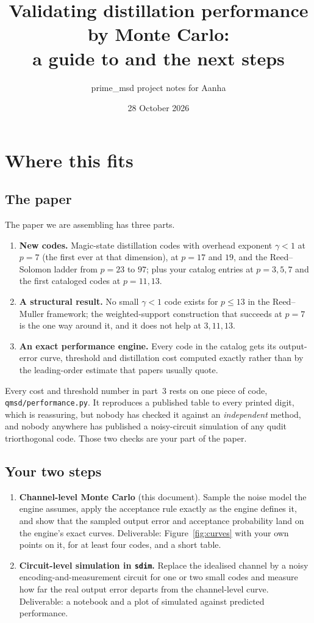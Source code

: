 \documentclass[11pt]{article}
\title{Validating distillation performance by Monte Carlo:\\ a guide to \code{qmsd.mc\_distill} and the next steps}
\author{prime\_msd project notes for Aanha}
\date{28 October 2026}
\newcommand{\code}[1]{\texttt{#1}}
\begin{document}
\maketitle
\tableofcontents

\section{Where this fits}

\subsection{The paper}

The paper we are assembling has three parts.

\begin{enumerate}[nosep]
\item \textbf{New codes.} Magic-state distillation codes with overhead exponent
  $\gamma<1$ at $p=7$ (the first ever at that dimension), at $p=17$ and $19$, and the
  Reed--Solomon ladder from $p=23$ to $97$; plus your catalog entries at $p=3,5,7$ and
  the first cataloged codes at $p=11,13$.
\item \textbf{A structural result.} No small $\gamma<1$ code exists for $p\le 13$ in
  the Reed--Muller framework; the weighted-support construction that succeeds at $p=7$
  is the one way around it, and it does not help at $3, 11, 13$.
\item \textbf{An exact performance engine.} Every code in the catalog gets its
  output-error curve, threshold and distillation cost computed exactly rather than
  by the leading-order estimate that papers usually quote.
\end{enumerate}

Every cost and threshold number in part~3 rests on one piece of code,
\code{qmsd/performance.py}. It reproduces a published table to every printed digit,
which is reassuring, but nobody has checked it against an \emph{independent} method,
and nobody anywhere has published a noisy-circuit simulation of any qudit
triorthogonal code. Those two checks are your part of the paper.

\subsection{Your two steps}

\begin{enumerate}[nosep]
\item \textbf{Channel-level Monte Carlo} (this document). Sample the noise model the
  engine assumes, apply the acceptance rule exactly as the engine defines it, and show
  that the sampled output error and acceptance probability land on the engine's
  exact curves. Deliverable: Figure~\ref{fig:curves} with your own points on it, for
  at least four codes, and a short table.
\item \textbf{Circuit-level simulation in \code{sdim}.} Replace the idealised
  channel by a noisy encoding-and-measurement circuit for one or two small codes and
  measure how far the real output error departs from the channel-level curve.
  Deliverable: a notebook and a plot of simulated against predicted performance.
\end{enumerate}
\end{document}
